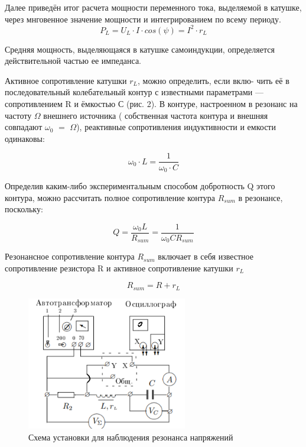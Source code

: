\documentclass[a4paper,12pt]{article}
\begin{document}
Далее приведён итог расчета мощности переменного тока, выделяемой в катушке, через мнговенное значение мощности и интегрированием по всему периоду. 
\begin{equation}\label{}
P_L = U_L\cdot I\cdot cos(\psi) = I^2\cdot r_L
\end{equation}

Средняя мощность, выделяющаяся в катушке самоиндукции, определяется действительной частью ее импеданса.

Активное сопротивление катушки $r_L$, можно определить, если вклю-
чить её в последовательный колебательный контур с известными параметрами — сопротивлением R и ёмкостью С (рис. 2). В контуре, настроенном в резонанс на частоту $\Omega$ внешнего источника ( собственная частота контура и внешняя совпадают $\omega_0$ $=$ $\Omega$), реактивные сопротивления индуктивности и емкости одинаковы:

\begin{equation}\label{}
\omega_0 \cdot L = \frac{1}{\omega_0\cdot C}
\end{equation}

Определив каким-либо экспериментальным способом добротность Q этого контура, можно рассчитать полное сопротивление контура $R_{sum}$ в резонансе, поскольку:

\begin{equation}\label{}
Q = \frac{\omega_0 L}{R_{sum}} = \frac{1}{\omega_0 C R_{sum}}
\end{equation}

Резонансное сопротивление контура $R_{sum}$ включает в себя известное сопротивление резистора R и активное сопротивление катушки $r_L$

\begin{equation}\label{}
R_{sum} = R + r_L
\end{equation}

\begin{figure}[h]
	\includegraphics[width= 7cm]{Pic2.png}
	\caption{Схема установки для наблюдения резонанса напряжений}
	\label{Pic2}
\end{figure}
\end{document}
